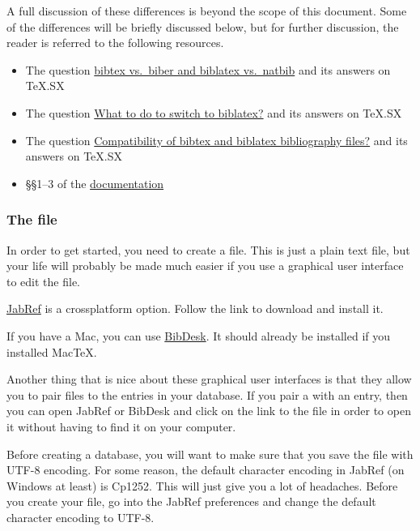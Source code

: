 A full discussion of these differences is beyond the scope of this document.
Some of the differences will be briefly discussed below, but for further discussion, the reader is referred to the following resources.

\begin{itemize}

	\item{The question \href{http://tex.stackexchange.com/q/25701/32888}{bibtex vs.~biber and biblatex vs.~natbib} and its answers on TeX.SX}

	\item{The question \href{http://tex.stackexchange.com/q/5091/32888}{What to do to switch to biblatex?} and its answers on TeX.SX}

	\item{The question \href{http://tex.stackexchange.com/q/37095/32888}{Compatibility of bibtex and biblatex bibliography files?} and its answers on TeX.SX}

	\item{\S\S1--3 of the \href{http://texdoc.net/texmf-dist/doc/latex/biblatex/biblatex.pdf}{ documentation}}

\end{itemize}

\subsubsection{The  file}
\label{subsubsec:the-bib-file}

In order to get started, you need to create a  file.
This is just a plain text file, but your life will probably be made much easier if you use a graphical user interface to edit the file.

\href{http://jabref.sourceforge.net/}{JabRef} is a crossplatform option.
Follow the link to download and install it.

If you have a Mac, you can use \href{http://bibdesk.sourceforge.net/}{BibDesk}.
It should already be installed if you installed {Mac\TeX}.

Another thing that is nice about these graphical user interfaces is that they allow you to pair  files to the entries in your database.
If you pair a  with an entry, then you can open JabRef or BibDesk and click on the link to the  file in order to open it without having to find it on your computer.

Before creating a database, you will want to make sure that you save the  file with UTF-8 encoding.
For some reason, the default character encoding in JabRef (on Windows at least) is Cp1252.
This will just give you a lot of headaches.
Before you create your  file, go into the JabRef preferences and change the default character encoding to UTF-8.

